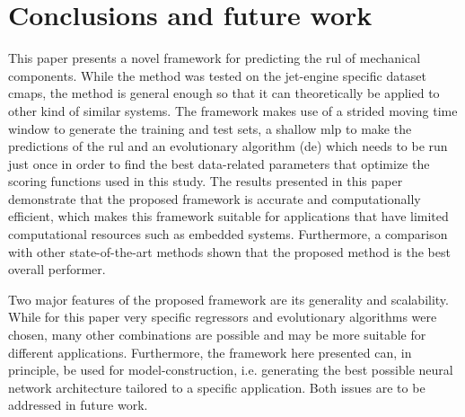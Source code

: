 \section{Conclusions and future work}
\label{sec:conclusions}

This paper presents a novel framework for predicting the \gls{rul} of mechanical components. While the method was tested on the jet-engine specific dataset \gls{cmaps}, the method is general enough so that it can theoretically be applied to other kind of similar systems. The framework makes use of a strided moving time window to generate the training and test sets, a shallow \gls{mlp} to make the predictions of the \gls{rul} and an evolutionary algorithm (\gls{de}) which needs to be run just once in order to find the best data-related parameters that optimize the scoring functions used in this study.  The results presented in this paper demonstrate that the proposed framework is accurate and computationally efficient, which makes this framework suitable for applications that have limited computational resources such as embedded systems. Furthermore, a comparison with other state-of-the-art methods shown that the proposed method is the best overall performer. 

Two major features of the proposed framework are its generality and scalability. While for this paper very specific regressors and evolutionary algorithms were chosen, many other combinations are possible and may be more suitable for different applications. Furthermore, the framework here presented can, in principle, be used for model-construction, i.e. generating the best possible neural network architecture tailored to a specific application. Both issues are to be addressed in future work.
